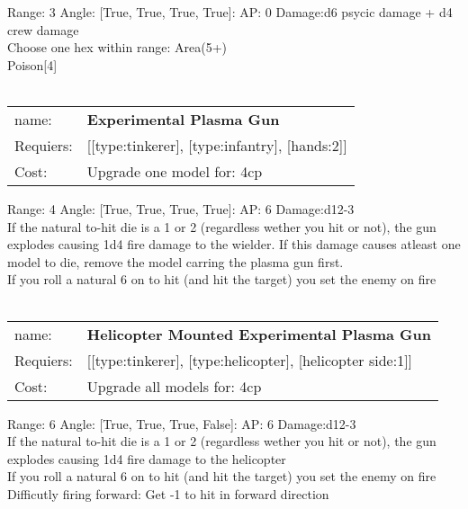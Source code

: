 Range: 3  Angle: [True, True, True, True]: AP: 0 Damage:d6 psycic damage + d4 crew damage \\
Choose one hex within range: Area(5+)\\ 
Poison[4]\\ 








\ \\
\begin{tabular}{ll}
name: & {\bf Experimental Plasma Gun } \\
Requiers: & [[type:tinkerer], [type:infantry], [hands:2]] \\
Cost: & Upgrade one model for: 4cp \\
\end{tabular}



Range: 4  Angle: [True, True, True, True]: AP: 6 Damage:d12-3 \\
If the natural to-hit die is a 1 or 2 (regardless wether you hit or not), the gun explodes causing 1d4 fire damage to the wielder. If this damage causes atleast one model to die, remove the model carring the plasma gun first.\\ 
If you roll a natural 6 on to hit (and hit the target) you set the enemy on fire\\ 








\ \\
\begin{tabular}{ll}
name: & {\bf Helicopter Mounted Experimental Plasma Gun } \\
Requiers: & [[type:tinkerer], [type:helicopter], [helicopter side:1]] \\
Cost: & Upgrade all models for: 4cp \\
\end{tabular}



Range: 6  Angle: [True, True, True, False]: AP: 6 Damage:d12-3 \\
If the natural to-hit die is a 1 or 2 (regardless wether you hit or not), the gun explodes causing 1d4 fire damage to the helicopter\\ 
If you roll a natural 6 on to hit (and hit the target) you set the enemy on fire\\ 
Difficutly firing forward: Get -1 to hit in forward direction\\ 








